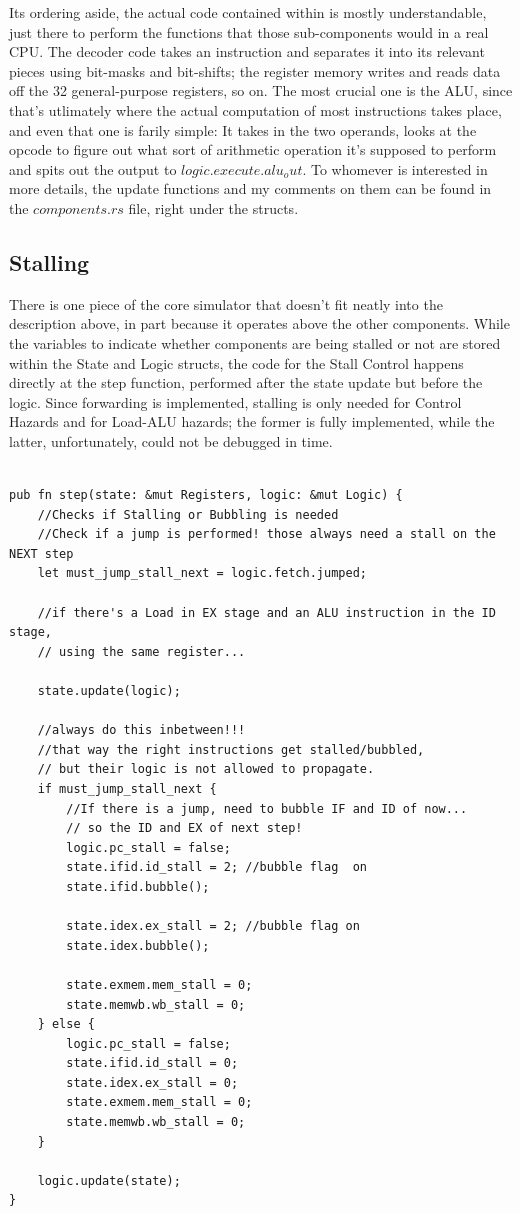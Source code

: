 \documentclass[12pt,twoside]{reedthesis}
\begin{document}
Its ordering aside, the actual code contained within is mostly understandable, just there to perform the functions that those sub-components would in a real CPU. The decoder code takes an instruction and separates it into its relevant pieces using bit-masks and bit-shifts; the register memory writes and reads data off the 32 general-purpose registers, so on. The most crucial one is the ALU, since that's  utlimately where the actual computation of most instructions takes place, and even that one is farily simple: It takes in the two operands, looks at the opcode to figure out what sort of arithmetic operation it's supposed to perform and spits out the output to $logic.execute.alu_out$. To whomever is interested in more details, the update functions and my comments on them can be found in the $components.rs$ file, right under the structs.

\subsection{Stalling}

There is one piece of the core simulator that doesn't fit neatly into the description above, in part because it operates above the other components. While the variables to indicate whether components are being stalled or not are stored within the State and Logic structs, the code for the Stall Control happens directly at the step function, performed after the state update but before the logic. Since forwarding is implemented, stalling is only needed for Control Hazards and for Load-ALU hazards; the former is fully implemented, while the latter, unfortunately, could not be debugged in time.

\begin{lstlisting}

pub fn step(state: &mut Registers, logic: &mut Logic) {
    //Checks if Stalling or Bubbling is needed
    //Check if a jump is performed! those always need a stall on the NEXT step
    let must_jump_stall_next = logic.fetch.jumped;

    //if there's a Load in EX stage and an ALU instruction in the ID stage,
	// using the same register...

    state.update(logic);

    //always do this inbetween!!!
	//that way the right instructions get stalled/bubbled,
	// but their logic is not allowed to propagate.
    if must_jump_stall_next {
        //If there is a jump, need to bubble IF and ID of now...
		// so the ID and EX of next step!
        logic.pc_stall = false;
        state.ifid.id_stall = 2; //bubble flag  on
        state.ifid.bubble();

        state.idex.ex_stall = 2; //bubble flag on
        state.idex.bubble();

        state.exmem.mem_stall = 0;
        state.memwb.wb_stall = 0;
    } else {
        logic.pc_stall = false;
        state.ifid.id_stall = 0;
        state.idex.ex_stall = 0;
        state.exmem.mem_stall = 0;
        state.memwb.wb_stall = 0;
    }

    logic.update(state);
}
\end{lstlisting}
\end{document}
